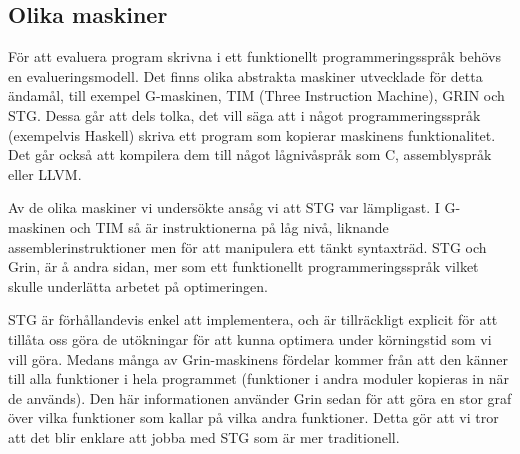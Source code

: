 \documentclass[../Core]{subfiles}
\begin{document}


\subsection{Olika maskiner}
\label{sec:Core:Mask}

För att evaluera program skrivna i ett funktionellt programmeringsspråk
behövs en evalueringsmodell. Det finns olika abstrakta maskiner utvecklade för
detta ändamål, till exempel G-maskinen, TIM (Three Instruction Machine), GRIN \cite{grin} och STG.
Dessa går att dels tolka, det vill säga att i något programmeringsspråk (exempelvis
Haskell) skriva ett program som kopierar maskinens funktionalitet. Det går också att
kompilera dem till något lågnivåspråk som C, assemblyspråk eller LLVM.


Av de olika maskiner vi undersökte ansåg vi att STG var lämpligast. I G-maskinen och TIM så är
instruktionerna på låg nivå, liknande assemblerinstruktioner men för att manipulera
ett tänkt syntaxträd. STG och Grin, är å andra sidan, mer som ett funktionellt
programmeringsspråk vilket skulle underlätta arbetet på optimeringen.

STG är förhållandevis enkel att implementera, och är tillräckligt explicit för att
tillåta oss göra de utökningar för att kunna optimera under körningstid som vi vill
göra. Medans många av Grin-maskinens fördelar kommer från att den känner till alla funktioner i hela
programmet (funktioner i andra moduler kopieras in när de används). Den här informationen
använder Grin sedan för att göra en stor graf över vilka funktioner som kallar på
vilka andra funktioner. Detta gör att vi tror att det blir enklare att jobba med STG 
som är mer traditionell.
\end{document}
